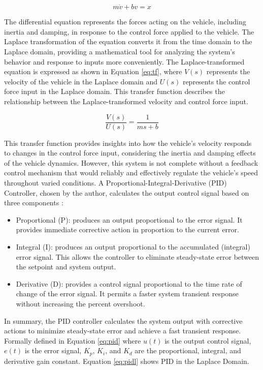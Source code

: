 \documentclass{article}
\begin{document}
\begin{equation}
    m\dot{v}+bv=x
    \label{eq:de}
\end{equation}

The differential equation represents the forces acting on the vehicle, including inertia and damping, in response to the control force applied to the vehicle. The Laplace transformation of the equation converts it from the time domain to the Laplace domain, providing a mathematical tool for analyzing the system's behavior and response to inputs more conveniently. The Laplace-transformed equation is expressed as shown in Equation \ref{eq:tf}, where $V(s)$ represents the velocity of the vehicle in the Laplace domain and $U(s)$ represents the control force input in the Laplace domain. This transfer function describes the relationship between the Laplace-transformed velocity and control force input.

\begin{equation}
\frac{V(s)}{U(s)} = \frac{1}{ms + b}
\label{eq:tf}
\end{equation}

This transfer function provides insights into how the vehicle's velocity responds to changes in the control force input, considering the inertia and damping effects of the vehicle dynamics. However, this system is not complete without a feedback control mechanism that would reliably and effectively regulate the vehicle's speed throughout varied conditions. A Proportional-Integral-Derivative (PID) Controller, chosen by the author, calculates the output control signal based on three components \cite{pid:2020}:

\begin{itemize}
    \item Proportional (P): produces an output proportional to the error signal. It provides immediate corrective action in proportion to the current error.
    \item Integral (I):  produces an output proportional to the accumulated (integral) error signal. This allows the controller to eliminate steady-state error between the setpoint and system output.
    \item Derivative (D): provides a control signal proportional to the time rate of change of the error signal. It permits a faster system transient response without increasing the percent overshoot.
\end{itemize}

In summary, the PID controller calculates the system output with corrective actions to minimize steady-state error and achieve a fast transient response. Formally defined in Equation \ref{eq:pid} where $u(t)$ is the output control signal, $e(t)$ is the error signal, $K_p$, $K_i$, and $K_d$ are the proportional, integral, and derivative gain constant. Equation \ref{eq:pidl} shows PID in the Laplace Domain.
\end{document}
